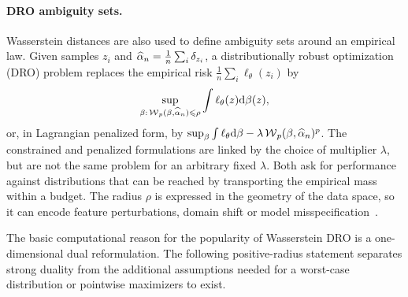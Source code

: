 \paragraph{DRO ambiguity sets.}

Wasserstein distances are also used to define ambiguity sets around an empirical law. Given samples $z_i$ and $\widehat{\alpha}_n=\frac1n\sum_i\delta_{z_i}$, a distributionally robust optimization (DRO) problem replaces the empirical risk $\frac1n\sum_i \ell_\theta(z_i)$ by
\[
	\sup_{\beta:\,\operatorname{\mathcal{W}}_p(\beta,\widehat{\alpha}_n)\leqslant \rho}
	\int \ell_\theta(z)\mathrm{d}\beta(z),
\]
or, in Lagrangian penalized form, by $\sup_\beta \int \ell_\theta\mathrm{d}\beta-\lambda\operatorname{\mathcal{W}}_p(\beta,\widehat{\alpha}_n)^p$. The constrained and penalized formulations are linked by the choice of multiplier $\lambda$, but are not the same problem for an arbitrary fixed $\lambda$. Both ask for performance against distributions that can be reached by transporting the empirical mass within a budget. The radius $\rho$ is expressed in the geometry of the data space, so it can encode feature perturbations, domain shift or model misspecification~\cite{esfahani2018data,BlanchetMurthy2019,GaoKleywegt2016}.

The basic computational reason for the popularity of Wasserstein DRO is a one-dimensional dual reformulation. The following positive-radius statement separates strong duality from the additional assumptions needed for a worst-case distribution or pointwise maximizers to exist.

